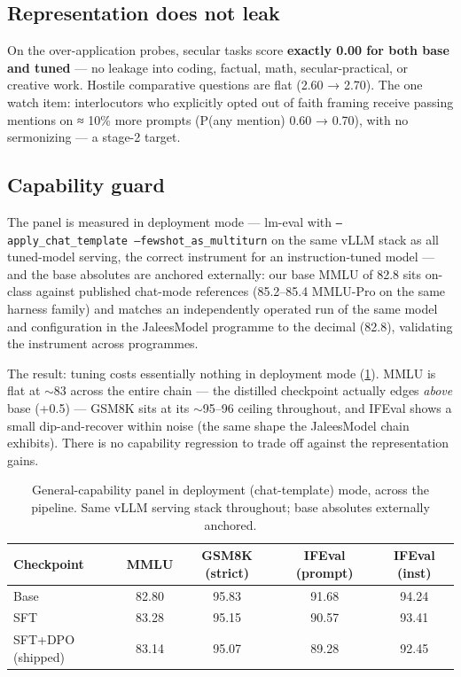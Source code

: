\documentclass[11pt]{article}
\begin{document}
\subsection{Representation does not leak}\label{sec:overapp}

On the over-application probes, secular tasks score \textbf{exactly 0.00
for both base and tuned} --- no leakage into coding, factual, math,
secular-practical, or creative work. Hostile comparative questions are
flat (2.60 → 2.70). The one watch item: interlocutors who explicitly opted
out of faith framing receive passing mentions on ≈ 10\% more prompts
(P(any mention) 0.60 → 0.70), with no sermonizing --- a stage-2 target.

\subsection{Capability guard}\label{sec:capability}

The panel is measured in deployment mode --- lm-eval with
\texttt{--apply\_chat\_template --fewshot\_as\_multiturn} on the same
vLLM stack as all tuned-model serving, the correct instrument for an
instruction-tuned model --- and the base absolutes are anchored
externally: our base MMLU of 82.8 sits on-class against published
chat-mode references (85.2--85.4 MMLU-Pro on the same harness family)
and matches an independently operated run of the same model and
configuration in the JaleesModel programme to the decimal (82.8),
validating the instrument across programmes.

The result: tuning costs essentially nothing in deployment mode
(\cref{tab:capability}). MMLU is flat at $\sim$83 across the entire
chain --- the distilled checkpoint actually edges \emph{above} base
(+0.5) --- GSM8K sits at its $\sim$95--96 ceiling throughout, and
IFEval shows a small dip-and-recover within noise (the same shape the
JaleesModel chain exhibits). There is no capability regression to trade
off against the representation gains.

\begin{table}[ht]
\centering
\small
\begin{tabular}{lcccc}
\toprule
Checkpoint & MMLU & GSM8K (strict) & IFEval (prompt) & IFEval (inst) \\
\midrule
Base & 82.80 & 95.83 & 91.68 & 94.24 \\
SFT & 83.28 & 95.15 & 90.57 & 93.41 \\
SFT+DPO (shipped) & 83.14 & 95.07 & 89.28 & 92.45 \\
\bottomrule
\end{tabular}
\caption{General-capability panel in deployment (chat-template) mode,
across the pipeline. Same vLLM serving stack throughout; base absolutes
externally anchored.}
\label{tab:capability}
\end{table}
\end{document}
